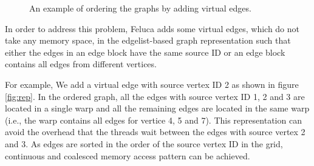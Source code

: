 \begin{figure}[h]
\centering
{}%
%
\caption{An example of ordering the graphs by adding virtual edges.}
\label{fig:virtual_edges}%
\end{figure}

In order to address this problem, Feluca adds some virtual edges, which do 
not take any memory space, in the edgelist-based graph representation such that either the edges in an edge block have the same source ID or an edge block contains all edges from different vertices. 

For example, We add a virtual edge with source vertex ID 2 as shown in figure \ref{fig:rep}. In the ordered graph, all the 
edges with source vertex ID 1, 2 and 3 are located in a single warp and all the 
remaining edges are located in the same warp (i.e., the warp contains all edges for vertice 4, 5 and 7). This representation can avoid the 
overhead that the threads wait between the edges with source vertex 2 and 3. As edges 
are sorted in the order of the source vertex ID in the grid, continuous and coalesced memory 
access pattern can be achieved.